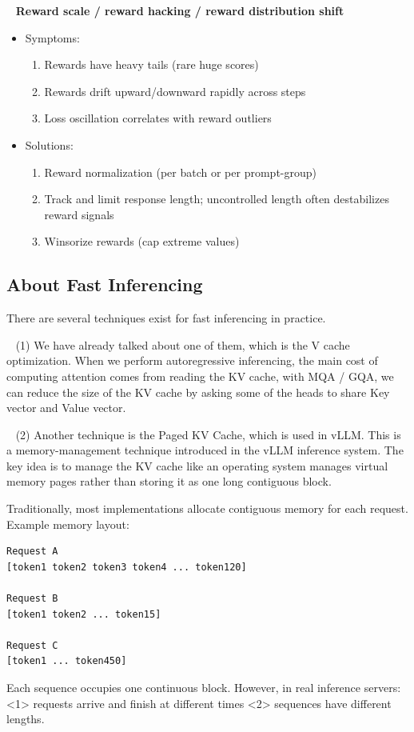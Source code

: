 \documentclass[11pt]{article}  %
\begin{document}
\textbullet~ \textbf{Reward scale / reward hacking / reward distribution shift}

\begin{itemize}
  \item Symptoms:
  \begin{enumerate}
    \item Rewards have heavy tails (rare huge scores)
    \item Rewards drift upward/downward rapidly across steps
    \item Loss oscillation correlates with reward outliers
  \end{enumerate}

  \item Solutions:
  \begin{enumerate}
    \item Reward normalization (per batch or per prompt-group)
    \item Track and limit response length; uncontrolled length often destabilizes reward signals
    \item Winsorize rewards (cap extreme values)
  \end{enumerate}
\end{itemize}


\subsection{About Fast Inferencing}
There are several techniques exist for fast inferencing in practice.

\textbullet~ (1) We have already talked about one of them, which is the V cache optimization.
When we perform autoregressive inferencing, the main cost of computing attention comes from reading the KV cache, with MQA / GQA, we can reduce the size of the KV cache by asking some of the heads to share Key vector and Value vector.

\textbullet~ (2) Another technique is the Paged KV Cache, which is used in vLLM.
This is a memory-management technique introduced in the vLLM inference system.
The key idea is to manage the KV cache like an operating system manages virtual memory pages rather than storing it as one long contiguous block.

Traditionally, most implementations allocate contiguous memory for each request.
Example memory layout:
\begin{verbatim}
Request A
[token1 token2 token3 token4 ... token120]

Request B
[token1 token2 ... token15]

Request C
[token1 ... token450]  
\end{verbatim}
Each sequence occupies one continuous block. 
However, in real inference servers: <1> requests arrive and finish at different times <2> sequences have different lengths.
\end{document}
